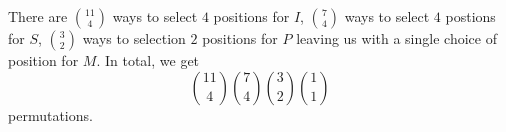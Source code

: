There are $\binom{11}{4}$ ways to select $4$ positions for $I$, ${7 \choose 4}$ ways to select $4$ postions for $S$, ${3 \choose 2}$ ways to selection $2$ positions for $P$ leaving us with a single choice of position for $M$. In total, we get
\[{11 \choose 4}{7 \choose 4}{3 \choose 2}{1 \choose 1}\] permutations.
